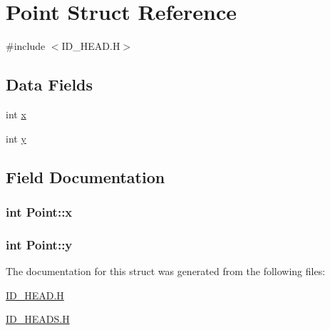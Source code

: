 \hypertarget{structPoint}{
\section{Point Struct Reference}
\label{structPoint}
}


{\ttfamily \#include $<$ID\_\-HEAD.H$>$}

\subsection*{Data Fields}
\begin{DoxyCompactItemize}
\item 
int \hyperlink{structPoint_a8c779e11e694b20e0946105a9f5de842}{x}
\item 
int \hyperlink{structPoint_a2e1b5fb2b2a83571f5c0bc0f66a73cf7}{y}
\end{DoxyCompactItemize}


\subsection{Field Documentation}
\hypertarget{structPoint_a8c779e11e694b20e0946105a9f5de842}{
\subsubsection[{x}]{\setlength{\rightskip}{0pt plus 5cm}int {\bf Point::x}}}
\label{structPoint_a8c779e11e694b20e0946105a9f5de842}
\hypertarget{structPoint_a2e1b5fb2b2a83571f5c0bc0f66a73cf7}{
\subsubsection[{y}]{\setlength{\rightskip}{0pt plus 5cm}int {\bf Point::y}}}
\label{structPoint_a2e1b5fb2b2a83571f5c0bc0f66a73cf7}


The documentation for this struct was generated from the following files:\begin{DoxyCompactItemize}
\item 
\hyperlink{ID__HEAD_8H}{ID\_\-HEAD.H}\item 
\hyperlink{ID__HEADS_8H}{ID\_\-HEADS.H}\end{DoxyCompactItemize}
